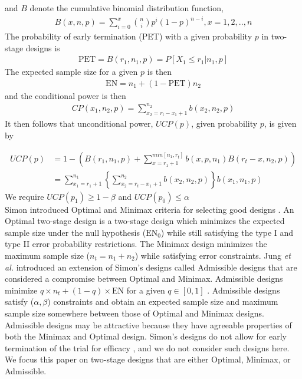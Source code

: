 \documentclass[12pt]{report}\usepackage[]{graphicx}\usepackage[]{color}
\newlength{\li}\setlength{\li}{14.48pt}
\newlength{\di}\setlength{\di}{-3.5mm}
\begin{document}
and $B$ denote the cumulative binomial distribution function, 
\begin{equation}
\begin{aligned}
B(x,n,p) = \sum_{i=0}^x {n \choose i} p^i(1-p)^{n-i}, x =  1,2,..,n
\end{aligned}
\end{equation}
The probability of early termination (PET) with a given probability $p$ in two-stage designs is 
\begin{equation}
\begin{aligned}
\mbox{PET} = B(r_1, n_1, p) = P[X_1 \leq r_1 \vert n_1, p]
\end{aligned}
\end{equation}
The expected sample size for a given $p$ is then 
\begin{equation}
\begin{aligned}
\mbox{EN} = n_1 + (1-\mbox{PET})n_2
\end{aligned}
\end{equation}
and the conditional power is then  
\begin{equation}
\begin{aligned}
CP(x_1, n_2, p) = \sum_{x_2 = r_t-x_1+1}^{n_2} b(x_2, n_2, p)
\end{aligned}
\end{equation}
It then follows that unconditional power, $UCP(p)$, given probability $p$, is given by 

\begin{equation}
\begin{aligned}
UCP(p) &= 1 - \left( B(r_1, n_1, p) + \sum_{x=r_1+1}^{min[n_1,{r_t}]} b(x, p, n_1) B(r_t-x,n_2,p) \right) \\
&= \sum_{x_1 = r_1+1}^{n_1} \left\{\sum_{x_2 = r_t-x_1+1}^{n_2} b(x_2, n_2, p) \right\} b(x_1, n_1, p)
\end{aligned}
\end{equation}
We require $UCP(p_1) \geq 1-\beta$ and $UCP(p_0) \leq \alpha$ \\


\indent Simon introduced Optimal and Minimax criteria for selecting good designs \cite{Simon}. An Optimal two-stage design is a two-stage design which minimizes the expected sample size under the null hypothesis ($\mbox{EN}_0$) while still satisfying the type I and type II error probability restrictions. The Minimax design minimizes the maximum sample size ($n_t = n_1 + n_2$) while satisfying error constraints. Jung \textit{et al.} \cite{Jung} introduced an extension of Simon's designs called Admissible designs that are considered a compromise between Optimal and Minimax. Admissible designs minimize $q \times n_t + (1-q) \times \mbox{EN}$ for a given $q \in [0,1]$ \cite{Jung}. Admissible designs satisfy ($\alpha, \beta$) constraints and obtain an expected sample size and maximum sample size somewhere between those of Optimal and Minimax designs. Admissible designs may be attractive because they have agreeable properties of both the Minimax and Optimal design.  Simon's designs do not allow for early termination of the trial for efficacy \cite{Simon}, and we do not consider such designs here. We focus this paper on two-stage designs that are either Optimal, Minimax, or Admissible. 
\end{document}
